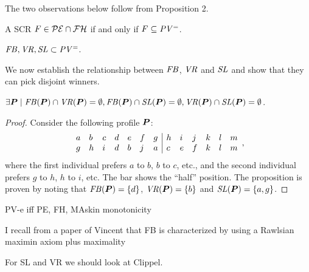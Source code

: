 \documentclass[version=3.21, pagesize, twoside=off, bibliography=totoc, DIV=calc, fontsize=12pt, a4paper]{scrartcl}
\begin{document}
The two observations below follow from Proposition 2.  
\begin{corollary}
	A SCR $F \in \mathcal{PE} \cap \mathcal{FH}$ if and only if $F\subseteq \mathit{PV^=}$.
\end{corollary}
 
\begin{corollary}
   	$\mathit{FB}, \mathit{VR}, \mathit{SL} \subset \mathit{PV^=}$.
\end{corollary}

We now establish the relationship between $\mathit{FB}$, $\mathit{VR}$ and $\mathit{SL}$ and show that they can pick disjoint winners.
\begin{proposition}
	$\exists \prof \suchthat \FB(\prof) \cap \VR(\prof) = \emptyset, \FB(\prof) \cap \SL(\prof) = \emptyset, \VR(\prof) \cap \SL(\prof) = \emptyset$.
\end{proposition}
\begin{proof}
	Consider the following profile $\bm{P}$:
	\begin{equation}
        \begin{array}{llll lll | llll ll}
                a&b&c&d&e&f&g&h&i&j&k&l&m\\
                g&h&i&d&b&j&a&c&e&f&k&l&m\\
        \end{array},
    \end{equation}
    where the first individual prefers $a$ to $b$, $b$ to $c$, etc., and the second individual prefers $g$ to $h$, $h$ to $i$, etc. 
    The bar shows the “half” position.
    The proposition is proven by noting that $\mathit{FB}(\bm{P}) = \{d\}$, $\mathit{VR}(\bm{P}) = \{b\}$ and $\mathit{SL}(\bm{P}) = \{a, g\}$.
\end{proof}



PV-e iff PE, FH, MAskin monotonicity

I recall from a paper of Vincent that FB is characterized by using a Rawlsian maximin axiom plus maximality 

For SL and VR we should look at Clippel. 
\end{document}
